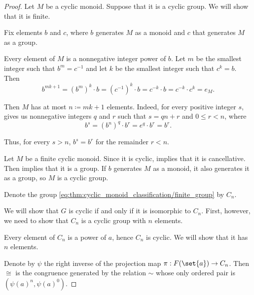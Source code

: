 \begin{proof}

  \SufficiencySubProof* Let \( M \) be a cyclic monoid. Suppose that it is a cyclic group. We will show that it is finite.

  Fix elements \( b \) and \( c \), where \( b \) generates \( M \) as a monoid and \( c \) that generates \( M \) as a group.

  Every element of \( M \) is a nonnegative integer power of \( b \). Let \( m \) be the smallest integer such that \( b^m = c^{-1} \) and let \( k \) be the smallest integer such that \( c^k = b \). Then
  \begin{equation*}
    b^{mk + 1} = (b^m)^k \cdot b = (c^{-1})^k \cdot b = c^{-k} \cdot b = c^{-k} \cdot c^k = e_M.
  \end{equation*}

  Then \( M \) has at most \( n \coloneqq mk + 1 \) elements. Indeed, for every positive integer \( s \),  gives us nonnegative integers \( q \) and \( r \) such that \( s = qn + r \) and \( 0 \leq r < n \), where
  \begin{equation*}
    b^s
    =
    (b^n)^q \cdot b^r
    =
    e^q \cdot b^r
    =
    b^r.
  \end{equation*}

  Thus, for every \( s > n \), \( b^s = b^r \) for the remainder \( r < n \).

  \NecessitySubProof* Let \( M \) be a finite cyclic monoid. Since it is cyclic,  implies that it is cancellative. Then  implies that it is a group. If \( b \) generates \( M \) as a monoid, it also generates it as a group, so \( M \) is a cyclic group.

   Denote the group \eqref{eq:thm:cyclic_monoid_classification/finite_group} by \( C_n \).

  We will show that \( G \) is cyclic if and only if it is isomorphic to \( C_n \). First, however, we need to show that \( C_n \) is a cyclic group with \( n \) elements.

   Every element of \( C_n \) is a power of \( a \), hence \( C_n \) is cyclic. We will show that it has \( n \) elements.

  Denote by \( \psi \) the right inverse of the projection map \( \pi: F(\set{ a }) \to C_n \). Then \( {\cong} \) is the congruence generated by the relation \( {\sim} \) whose only ordered pair is \( (\psi(a)^n, \psi(a)^0) \).


\end{proof}
